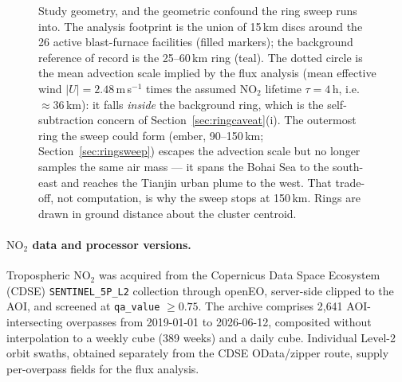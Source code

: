 \documentclass[11pt,a4paper]{article}
\providecommand{\ce}[1]{\ensuremath{\mathrm{#1}}}
\begin{document}
\begin{figure}[t]
\caption{Study geometry, and the geometric confound the ring sweep runs into. The analysis
footprint is the union of 15\,km discs around the 26 active blast-furnace facilities (filled
markers); the background reference of record is the 25--60\,km ring (teal). The dotted circle is
the mean advection scale implied by the flux analysis (mean effective wind $|U|=2.48$\,m\,s$^{-1}$
times the assumed \ce{NO_2} lifetime $\tau=4$\,h, i.e.\ $\approx36$\,km): it falls \emph{inside}
the background ring, which is the self-subtraction concern of Section~\ref{sec:ringcaveat}(i).
The outermost ring the sweep could form (ember, 90--150\,km; Section~\ref{sec:ringsweep}) escapes
the advection scale but no longer samples the same air mass --- it spans the Bohai Sea to the
south-east and reaches the Tianjin urban plume to the west. That trade-off, not computation, is
why the sweep stops at 150\,km. Rings are drawn in ground distance about the cluster centroid.}
\label{fig:map}
\end{figure}

\paragraph{\ce{NO_2} data and processor versions.} Tropospheric \ce{NO_2} was acquired from the
Copernicus Data Space Ecosystem (CDSE) \texttt{SENTINEL\_5P\_L2} collection through openEO,
server-side clipped to the AOI, and screened at \texttt{qa\_value} $\ge0.75$. The archive
comprises 2{,}641 AOI-intersecting overpasses from 2019-01-01 to 2026-06-12, composited without
interpolation to a weekly cube (389 weeks) and a daily cube. Individual Level-2 orbit swaths,
obtained separately from the CDSE OData/zipper route, supply per-overpass fields for the flux
analysis.
\end{document}
